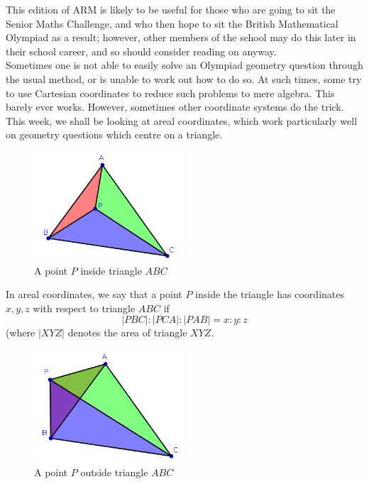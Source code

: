 \documentclass{article}
\begin{document}
This edition of ARM is likely to be useful for those who are going to sit the Senior Maths Challenge, and who then hope to sit the British Mathematical Olympiad as a result; however, other members of the school may do this later in their school career, and so should consider reading on anyway.\\

Sometimes one is not able to easily solve an Olympiad geometry question through the usual method, or is unable to work out how to do so. At such times, some try to use Cartesian coordinates to reduce such problems to mere algebra. This barely ever works. However, sometimes other coordinate systems do the trick. This week, we shall be looking at areal coordinates, which work particularly well on geometry questions which centre on a triangle.

\begin{figure}[h]
	\centering
	\includegraphics[width=0.5\textwidth]{areals}
	\caption{A point \(P\) inside triangle \(ABC\)}
\end{figure}

In areal coordinates, we say that a point \(P\) inside the triangle has coordinates \(x,y,z\) with respect to triangle \(ABC\) if \[|PBC|:|PCA|:|PAB|=x:y:z\]
(where \(|XYZ|\) denotes the area of triangle \(XYZ\).

\begin{figure}[h]
	\centering
	\includegraphics[width=0.5\textwidth]{areals2}
	\caption{A point \(P\) outside triangle \(ABC\)}
\end{figure}
\end{document}

